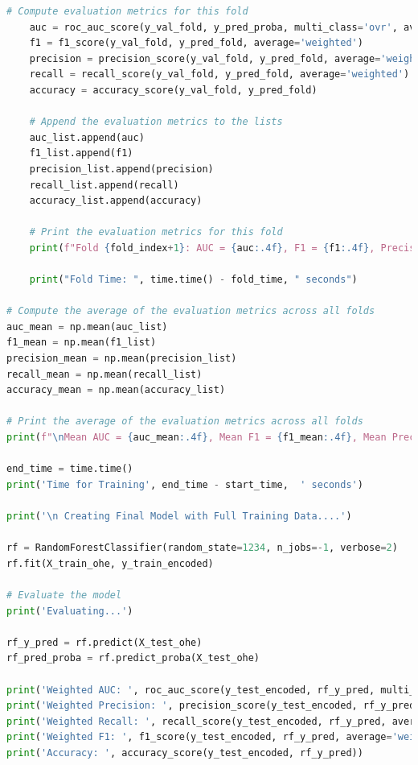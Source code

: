 \begin{appendices}
\begin{lstlisting}[language=Python]
    # Compute evaluation metrics for this fold
    auc = roc_auc_score(y_val_fold, y_pred_proba, multi_class='ovr', average='weighted')
    f1 = f1_score(y_val_fold, y_pred_fold, average='weighted')
    precision = precision_score(y_val_fold, y_pred_fold, average='weighted')
    recall = recall_score(y_val_fold, y_pred_fold, average='weighted')
    accuracy = accuracy_score(y_val_fold, y_pred_fold)
    
    # Append the evaluation metrics to the lists
    auc_list.append(auc)
    f1_list.append(f1)
    precision_list.append(precision)
    recall_list.append(recall)
    accuracy_list.append(accuracy)
    
    # Print the evaluation metrics for this fold
    print(f"Fold {fold_index+1}: AUC = {auc:.4f}, F1 = {f1:.4f}, Precision = {precision:.4f}, Recall = {recall:.4f}, Accuracy = {accuracy:.4f}")

    print("Fold Time: ", time.time() - fold_time, " seconds")

# Compute the average of the evaluation metrics across all folds
auc_mean = np.mean(auc_list)
f1_mean = np.mean(f1_list)
precision_mean = np.mean(precision_list)
recall_mean = np.mean(recall_list)
accuracy_mean = np.mean(accuracy_list)

# Print the average of the evaluation metrics across all folds
print(f"\nMean AUC = {auc_mean:.4f}, Mean F1 = {f1_mean:.4f}, Mean Precision = {precision_mean:.4f}, Mean Recall = {recall_mean:.4f}, Mean Accuracy = {accuracy_mean:.4f}")

end_time = time.time()
print('Time for Training', end_time - start_time,  ' seconds')

print('\n Creating Final Model with Full Training Data....')

rf = RandomForestClassifier(random_state=1234, n_jobs=-1, verbose=2)
rf.fit(X_train_ohe, y_train_encoded)

# Evaluate the model
print('Evaluating...')

rf_y_pred = rf.predict(X_test_ohe)
rf_pred_proba = rf.predict_proba(X_test_ohe)

print('Weighted AUC: ', roc_auc_score(y_test_encoded, rf_y_pred, multi_class='ovr', average='weighted'))
print('Weighted Precision: ', precision_score(y_test_encoded, rf_y_pred, average='weighted'))
print('Weighted Recall: ', recall_score(y_test_encoded, rf_y_pred, average='weighted'))
print('Weighted F1: ', f1_score(y_test_encoded, rf_y_pred, average='weighted'))
print('Accuracy: ', accuracy_score(y_test_encoded, rf_y_pred))



\end{lstlisting}
\end{appendices}
